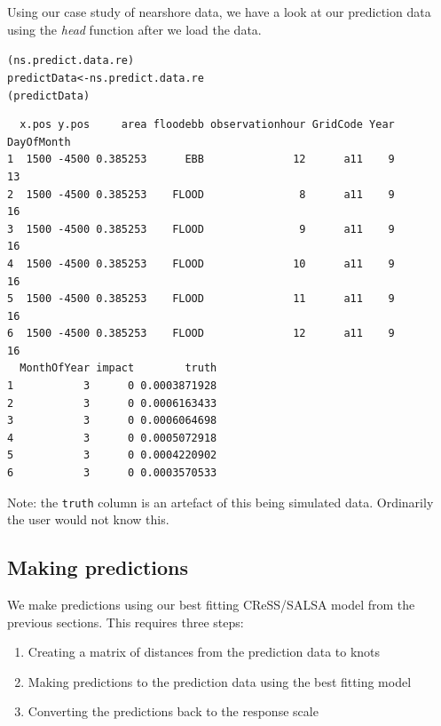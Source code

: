 \noindent Using our case study of nearshore data, we have a look at our prediction data using the \textit{head} function after we load the data. 
\begin{knitrout}\footnotesize
{}\color{fgcolor}\begin{kframe}
\begin{alltt}
(ns.predict.data.re)
predictData <- ns.predict.data.re
(predictData)
\end{alltt}
\begin{verbatim}
  x.pos y.pos     area floodebb observationhour GridCode Year DayOfMonth
1  1500 -4500 0.385253      EBB              12      a11    9         13
2  1500 -4500 0.385253    FLOOD               8      a11    9         16
3  1500 -4500 0.385253    FLOOD               9      a11    9         16
4  1500 -4500 0.385253    FLOOD              10      a11    9         16
5  1500 -4500 0.385253    FLOOD              11      a11    9         16
6  1500 -4500 0.385253    FLOOD              12      a11    9         16
  MonthOfYear impact        truth
1           3      0 0.0003871928
2           3      0 0.0006163433
3           3      0 0.0006064698
4           3      0 0.0005072918
5           3      0 0.0004220902
6           3      0 0.0003570533
\end{verbatim}
\end{kframe}
\end{knitrout}

\noindent Note: the {\tt truth} column is an artefact of this being simulated data.   Ordinarily the user would not know this.


\subsection{Making predictions}
\label{ss:predictions}
\noindent We make predictions using our best fitting CReSS/SALSA model from the previous sections. This requires three steps: 
\begin{enumerate}
\item{Creating a matrix of distances from the prediction data to knots}
\item{Making predictions to the prediction data using the best fitting model}
\item{Converting the predictions back to the response scale}
\end{enumerate}

